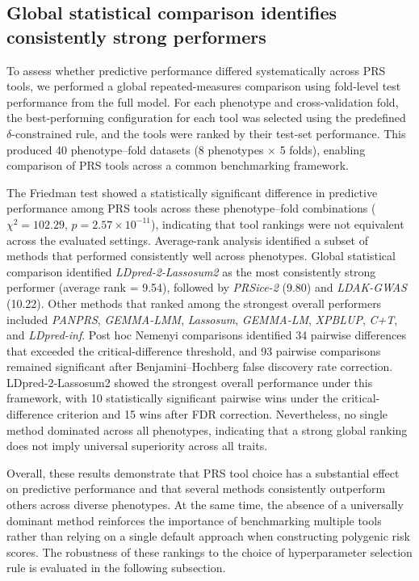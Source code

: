 \documentclass[pdflatex,sn-basic]{sn-jnl}
\begin{document}
\subsection*{Global statistical comparison identifies consistently strong performers}

To assess whether predictive performance differed systematically across PRS tools, we performed a global repeated-measures comparison using fold-level test performance from the full model. For each phenotype and cross-validation fold, the best-performing configuration for each tool was selected using the predefined $\delta$-constrained rule, and the tools were ranked by their test-set performance. This produced 40 phenotype--fold datasets (8 phenotypes $\times$ 5 folds), enabling comparison of PRS tools across a common benchmarking framework.

The Friedman test showed a statistically significant difference in predictive performance among PRS tools across these phenotype--fold combinations ($\chi^2 = 102.29$, $p = 2.57 \times 10^{-11}$), indicating that tool rankings were not equivalent across the evaluated settings. Average-rank analysis identified a subset of methods that performed consistently well across phenotypes. Global statistical comparison identified \textit{LDpred-2-Lassosum2} as the most consistently strong performer (average rank = 9.54), followed by \textit{PRSice-2} (9.80) and \textit{LDAK-GWAS} (10.22). Other methods that ranked among the strongest overall performers included \textit{PANPRS}, \textit{GEMMA-LMM}, \textit{Lassosum}, \textit{GEMMA-LM}, \textit{XPBLUP}, \textit{C+T}, and \textit{LDpred-inf}. Post hoc Nemenyi comparisons identified 34 pairwise differences that exceeded the critical-difference threshold, and 93 pairwise comparisons remained significant after Benjamini--Hochberg false discovery rate correction. LDpred-2-Lassosum2 showed the strongest overall performance under this framework, with 10 statistically significant pairwise wins under the critical-difference criterion and 15 wins after FDR correction. Nevertheless, no single method dominated across all phenotypes, indicating that a strong global ranking does not imply universal superiority across all traits.

Overall, these results demonstrate that PRS tool choice has a substantial effect on predictive performance and that several methods consistently outperform others across diverse phenotypes. At the same time, the absence of a universally dominant method reinforces the importance of benchmarking multiple tools rather than relying on a single default approach when constructing polygenic risk scores. The robustness of these rankings to the choice of hyperparameter selection rule is evaluated in the following subsection.
\end{document}
